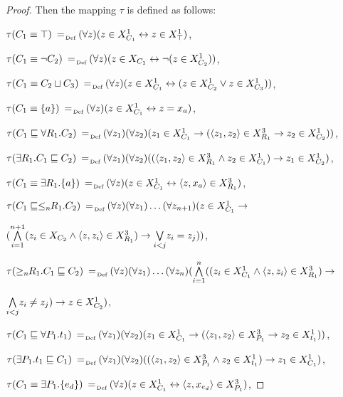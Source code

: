 \documentclass[a4paper]{llncs}
\newcommand{\defAs}{\mathrel{\makebox{\:= \hspace{-.2cm} \raisebox{-0.5 ex}[0 ex][0 ex]{\tiny Def}}}}
\begin{document}
\begin{proof}
Then the mapping $\tau$ is defined as follows:
\smallskip

{\small
\noindent $\tau(C_1 \equiv \top) \defAs (\forall z)(z \in X_{C_1}^1 \leftrightarrow z \in X_{\top}^1)$,

\noindent $\tau(C_1 \equiv \neg C_2) \defAs (\forall z)(z \in X_{C_1} \leftrightarrow \neg(z \in X_{C_2}^1))$,

\noindent $\tau(C_1 \equiv C_2 \sqcup C_3 ) \defAs (\forall z)(z \in X_{C_1}^1 \leftrightarrow (z \in X_{C_2}^1 \vee z \in X_{C_3}^1))$,

\noindent $\tau(C_1 \equiv \{a\}) \defAs (\forall z)(z \in X_{C_1}^1 \leftrightarrow z = x_a)$,

\noindent $\tau(C_1 \sqsubseteq \forall R_1.C_2) \defAs (\forall z_1)(\forall z_2)(z_1 \in X_{C_1}^1 \rightarrow (\langle z_1,z_2 \rangle \in X_{R_1}^3 \rightarrow z_2 \in X_{C_2}^1))$,

\noindent $\tau(\exists R_1.C_1 \sqsubseteq C_2) \defAs (\forall z_1)(\forall z_2)((\langle z_1,z_2 \rangle \in X_{R_1}^3 \wedge z_2 \in X_{C_1}^1) \rightarrow z_1 \in X_{C_2}^1)$,

\noindent $\tau(C_1 \equiv \exists R_1.\{a\}) \defAs(\forall z)(z \in X_{C_1}^1 \leftrightarrow \langle z,x_{a}\rangle \in X_{R_1}^3)$,

\noindent $\tau(C_1 \sqsubseteq \leq_n\!\! R_1.C_2) \defAs (\forall z)(\forall z_1)\ldots (\forall z_{n+1})(z \in X_{C_1}^1 \rightarrow$

\noindent $\hfill  ( \overset{n+1}{\underset{i=1}\bigwedge}(z_i \in X_{C_2} \wedge \langle z,z_i\rangle \in X_{R_1}^3) \rightarrow \underset {i<j} {\bigvee} z_i = z_j))$,

\noindent $\tau(\geq_n\!\! R_1.C_1 \sqsubseteq C_2) \defAs (\forall z)(\forall z_1)\ldots (\forall z_{n})( \overset {n}{ \underset{i=1}\bigwedge }((z_i \in X_{C_1}^1 \wedge \langle z,z_i\rangle \in X_{R_1}^3) \rightarrow$

\noindent $\hfill  \underset {i<j} \bigwedge z_i \neq z_j) \rightarrow z \in X_{C_2}^1)$,

\noindent $\tau(C_1 \sqsubseteq \forall P_1.t_1) \defAs (\forall z_1)(\forall z_2)(z_1 \in X_{C_1}^1 \rightarrow (\langle z_1,z_2 \rangle \in X_{P_1}^3 \rightarrow z_2 \in X_{t_1}^1))$,

\noindent $\tau(\exists P_1.t_1 \sqsubseteq C_1) \defAs (\forall z_1)(\forall z_2)((\langle z_1,z_2 \rangle \in X_{P_1}^3 \wedge z_2 \in X_{t_1}^1) \rightarrow z_1 \in X_{C_1}^1)$,

\noindent $\tau(C_1 \equiv \exists P_1.\{e_{d}\}) \defAs (\forall z)(z \in X_{C_1}^1 \leftrightarrow \langle z,x_{e_{d}}\rangle \in X_{P_1}^3)$,

}
\end{proof}
\end{document}
